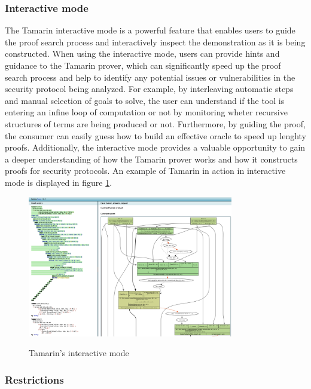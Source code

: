 \documentclass[fleqn,10pt]{SelfArx} %
\begin{document}
\subsubsection{Interactive mode}\label{subsec:tamarinGui}

The Tamarin interactive mode is a powerful feature that enables users to guide the proof search process and interactively inspect the demonstration as it is being constructed. When using the interactive mode, users can provide hints and guidance to the Tamarin prover, which can significantly speed up the proof search process and help to identify any potential issues or vulnerabilities in the security protocol being analyzed. For example, by interleaving automatic steps and manual selection of goals to solve, the user can understand if the tool is entering an infine loop of computation or not by monitoring wheter recursive structures of terms are being produced or not. Furthermore, by guiding the proof, the consumer can easily guess how to build an effective oracle to speed up lenghty proofs. Additionally, the interactive mode provides a valuable opportunity to gain a deeper understanding of how the Tamarin prover works and how it constructs proofs for security protocols. An example of Tamarin in action in interactive mode is displayed in figure \ref{fig:interactive}.

\begin{figure}
    \centering
    \captionsetup{justification=centering, margin=1cm}
    \includegraphics[width=0.8\textwidth]{Figures/gui.png}
    \label{fig:interactive}
    \caption{Tamarin's interactive mode}
\end{figure}

\subsubsection{Restrictions}
\end{document}
